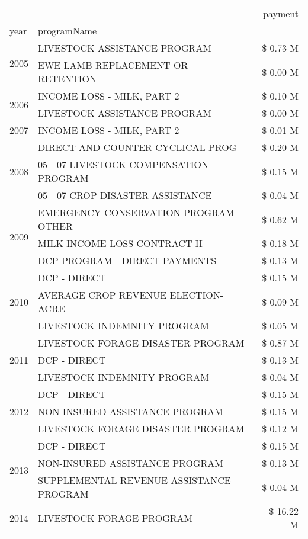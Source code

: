 \begin{tabular}{llr}
\toprule
 &  & payment \\
year & programName &  \\
\midrule
\multirow[t]{2}{*}{2005} & LIVESTOCK ASSISTANCE PROGRAM & \$ 0.73 M \\
 & EWE LAMB REPLACEMENT OR RETENTION & \$ 0.00 M \\
\cline{1-3}
\multirow[t]{2}{*}{2006} & INCOME LOSS - MILK, PART 2 & \$ 0.10 M \\
 & LIVESTOCK ASSISTANCE PROGRAM & \$ 0.00 M \\
\cline{1-3}
2007 & INCOME LOSS - MILK, PART 2 & \$ 0.01 M \\
\cline{1-3}
\multirow[t]{3}{*}{2008} & DIRECT AND COUNTER CYCLICAL PROG & \$ 0.20 M \\
 & 05 - 07 LIVESTOCK COMPENSATION PROGRAM & \$ 0.15 M \\
 & 05 - 07 CROP DISASTER ASSISTANCE & \$ 0.04 M \\
\cline{1-3}
\multirow[t]{3}{*}{2009} & EMERGENCY CONSERVATION PROGRAM - OTHER & \$ 0.62 M \\
 & MILK INCOME LOSS CONTRACT II & \$ 0.18 M \\
 & DCP PROGRAM - DIRECT PAYMENTS & \$ 0.13 M \\
\cline{1-3}
\multirow[t]{3}{*}{2010} & DCP - DIRECT & \$ 0.15 M \\
 & AVERAGE CROP REVENUE ELECTION-ACRE & \$ 0.09 M \\
 & LIVESTOCK INDEMNITY PROGRAM & \$ 0.05 M \\
\cline{1-3}
\multirow[t]{3}{*}{2011} & LIVESTOCK FORAGE DISASTER PROGRAM & \$ 0.87 M \\
 & DCP - DIRECT & \$ 0.13 M \\
 & LIVESTOCK INDEMNITY PROGRAM & \$ 0.04 M \\
\cline{1-3}
\multirow[t]{3}{*}{2012} & DCP - DIRECT & \$ 0.15 M \\
 & NON-INSURED ASSISTANCE PROGRAM & \$ 0.15 M \\
 & LIVESTOCK FORAGE DISASTER PROGRAM & \$ 0.12 M \\
\cline{1-3}
\multirow[t]{3}{*}{2013} & DCP - DIRECT & \$ 0.15 M \\
 & NON-INSURED ASSISTANCE PROGRAM & \$ 0.13 M \\
 & SUPPLEMENTAL REVENUE ASSISTANCE PROGRAM & \$ 0.04 M \\
\cline{1-3}
\multirow[t]{3}{*}{2014} & LIVESTOCK FORAGE PROGRAM & \$ 16.22 M \\

\end{tabular}
